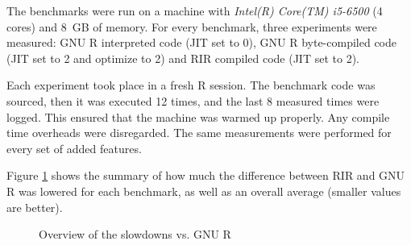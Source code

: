 
The benchmarks were run on a machine with \emph{Intel(R) Core(TM) i5-6500} (4 cores) and 8~GB of memory. For every benchmark, three experiments were measured: GNU R interpreted code (JIT set to 0), GNU R byte-compiled code (JIT set to 2 and optimize to 2) and RIR compiled code (JIT set to 2).

Each experiment took place in a fresh R session. The benchmark code was sourced, then it was executed 12 times, and the last 8 measured times were logged. This ensured that the machine was warmed up properly. Any compile time overheads were disregarded. The same measurements were performed for every set of added features.

Figure \ref{fig:overall} shows the summary of how much the difference between RIR and GNU R was lowered for each benchmark, as well as an overall average (smaller values are better).

\begin{figure}[htbp]
  \caption{\label{fig:overall}Overview of the slowdowns vs. GNU R}
  \centering
\end{figure}

